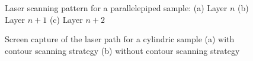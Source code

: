 \begin{figure}[ht]
\centering
\noindent{}
\decoRule
\caption[Screen capture of the laser scanning pattern for a parallelepiped sample: (a) Layer $n$ (b) Layer $n+1$ (c) Layer $n+2$]{Laser scanning pattern for a parallelepiped sample: (a) Layer $n$ (b) Layer $n+1$ (c) Layer $n+2$}
\label{fig:Lassup}
\end{figure}

\begin{figure}[ht]
\centering
\noindent{}
\decoRule
\caption[Screen capture of the laser path for a cylindric sample (a) with contour scanning strategy (b) without contour scanning strategy]{Screen capture of the laser path for a cylindric sample (a) with contour scanning strategy (b) without contour scanning strategy}
\label{fig:LasCSC}
\end{figure}
